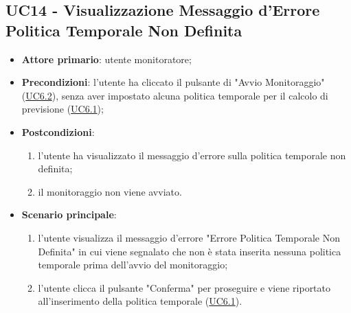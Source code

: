 
		\label{par:UC14}
	\subsection{UC14 - Visualizzazione Messaggio d'Errore Politica Temporale Non Definita}
		\begin{itemize}
			\item\textbf{Attore primario}: utente monitoratore;
			\item\textbf{Precondizioni}: l’utente ha cliccato il pulsante di "Avvio Monitoraggio" (\hyperref[par:UC6.2]{UC6.2}), senza aver impostato alcuna politica temporale per il calcolo di previsione (\hyperref[par:UC6.1]{UC6.1});
			\item\textbf{Postcondizioni}:
				\begin{enumerate}
					\item l’utente ha visualizzato il messaggio d'errore sulla politica temporale non definita;		
					\item	il monitoraggio non viene avviato.
				\end{enumerate}
			\item\textbf{Scenario principale}:
				\begin{enumerate}
					\item l’utente visualizza il messaggio d'errore "Errore Politica Temporale Non Definita" in cui viene segnalato che non è stata inserita nessuna politica temporale prima dell'avvio del monitoraggio;
					\item l'utente clicca il pulsante "Conferma" per proseguire e viene riportato all'inserimento della politica temporale (\hyperref[par:UC6.1]{UC6.1}).		
				\end{enumerate}		
		\end{itemize}

	
		\label{par:UC15}
